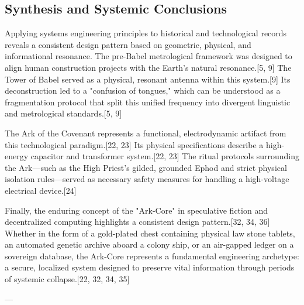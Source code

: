 \documentclass[aps,prd,11pt,onecolumn,superscriptaddress,nofootinbib,floatfix]{revtex4-2}
\begin{document}
\subsection{Synthesis and Systemic Conclusions}
Applying systems engineering principles to historical and technological records reveals a consistent design pattern based on geometric, physical, and informational resonance. The pre-Babel metrological framework was designed to align human construction projects with the Earth's natural resonance.[5, 9] The Tower of Babel served as a physical, resonant antenna within this system.[9] Its deconstruction led to a "confusion of tongues," which can be understood as a fragmentation protocol that split this unified frequency into divergent linguistic and metrological standards.[5, 9]


The Ark of the Covenant represents a functional, electrodynamic artifact from this technological paradigm.[22, 23] Its physical specifications describe a high-energy capacitor and transformer system.[22, 23] The ritual protocols surrounding the Ark---such as the High Priest's gilded, grounded Ephod and strict physical isolation rules---served as necessary safety measures for handling a high-voltage electrical device.[24]


Finally, the enduring concept of the "Ark-Core" in speculative fiction and decentralized computing highlights a consistent design pattern.[32, 34, 36] Whether in the form of a gold-plated chest containing physical law stone tablets, an automated genetic archive aboard a colony ship, or an air-gapped ledger on a sovereign database, the Ark-Core represents a fundamental engineering archetype: a secure, localized system designed to preserve vital information through periods of systemic collapse.[22, 32, 34, 35]




---
\end{document}

